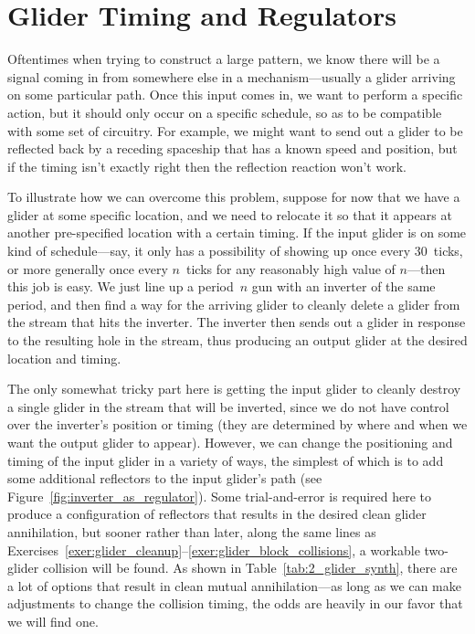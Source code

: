 \section{Glider Timing and Regulators}\label{sec:periodic_regulators}

Oftentimes when trying to construct a large pattern, we know there will be a signal coming in from somewhere else in a mechanism---usually a glider arriving on some particular path. Once this input comes in, we want to perform a specific action, but it should only occur on a specific schedule, so as to be compatible with some set of circuitry. For example, we might want to send out a glider to be reflected back by a receding spaceship that has a known speed and position, but if the timing isn't exactly right then the reflection reaction won't work.

To illustrate how we can overcome this problem, suppose for now that we have a glider at some specific location, and we need to relocate it so that it appears at another pre-specified location with a certain timing. If the input glider is on some kind of schedule---say, it only has a possibility of showing up once every $30$~ticks, or more generally once every $n$~ticks for any reasonably high value of $n$---then this job is easy. We just line up a period~$n$ gun with an inverter of the same period, and then find a way for the arriving glider to cleanly delete a glider from the stream that hits the inverter. The inverter then sends out a glider in response to the resulting hole in the stream, thus producing an output glider at the desired location and timing.

The only somewhat tricky part here is getting the input glider to cleanly destroy a single glider in the stream that will be inverted, since we do not have control over the inverter's position or timing (they are determined by where and when we want the output glider to appear). However, we can change the positioning and timing of the input glider in a variety of ways, the simplest of which is to add some additional reflectors to the input glider's path (see Figure~\ref{fig:inverter_as_regulator}). Some trial-and-error is required here to produce a configuration of reflectors that results in the desired clean glider annihilation, but sooner rather than later, along the same lines as Exercises~\ref{exer:glider_cleanup}--\ref{exer:glider_block_collisions}, a workable two-glider collision will be found. As shown in Table~\ref{tab:2_glider_synth}, there are a lot of options that result in clean mutual annihilation---as long as we can make adjustments to change the collision timing, the odds are heavily in our favor that we will find one.

